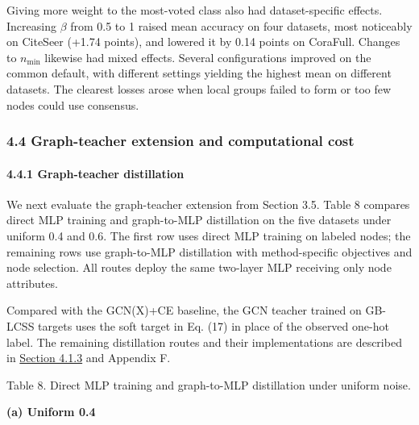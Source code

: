 Giving more weight to the most-voted class also had dataset-specific effects. Increasing \(\mathit{\beta}\) from 0.5 to 1 raised mean accuracy on four datasets, most noticeably on CiteSeer (+1.74 points), and lowered it by 0.14 points on CoraFull. Changes to \(\mathit{n}_{\min}\) likewise had mixed effects. Several configurations improved on the common default, with different settings yielding the highest mean on different datasets. The clearest losses arose when local groups failed to form or too few nodes could use consensus.

\subsubsection{4.4 Graph-teacher extension and computational cost}\label{graph-teacher-extension-and-computational-cost}

\paragraph{4.4.1 Graph-teacher distillation}\label{graph-teacher-distillation}

We next evaluate the graph-teacher extension from Section 3.5. Table 8 compares direct MLP training and graph-to-MLP distillation on the five datasets under uniform 0.4 and 0.6. The first row uses direct MLP training on labeled nodes; the remaining rows use graph-to-MLP distillation with method-specific objectives and node selection. All routes deploy the same two-layer MLP receiving only node attributes.

Compared with the GCN(X)+CE baseline, the GCN teacher trained on GB-LCSS targets uses the soft target in Eq. (17) in place of the observed one-hot label. The remaining distillation routes and their implementations are described in \hyperref[compared-methods]{Section 4.1.3} and Appendix F.

Table 8. Direct MLP training and graph-to-MLP distillation under uniform noise.

\textbf{(a) Uniform 0.4}

